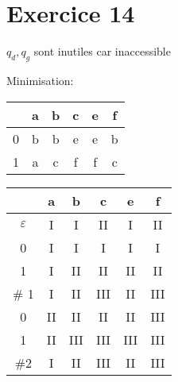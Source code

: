 \documentclass[12pt]{report}
\begin{document}
\section{Exercice 14}

$q_d, q_g$ sont inutiles car inaccessible

Minimisation:\\
\begin{tabular}{|c|c|c|c|c|c|}
    \hline
        & a   & b & c & e & f  \\ \hline
    0   & b  & b & e & e & b  \\ \hline
    1   & a   & c & f & f & c   \\ \hline
\end{tabular}\hspace{2cm}
\begin{tabular}{|c|c|c|c|c|c|}
    \hline
        & a   & b & c & e & f  \\ \hline
    $\varepsilon$   & I  & I & II & I & II  \\ \hline
    0   & I  & I & I & I & I   \\ \hline
    1   & I  & II & II & II & II   \\ \hline
     \hline
    $\#$ 1 & I & II & III & II & III \\ \hline
    0 & II & II & II & II & III\\ \hline
    1 & II & III & III & III & III\\ \hline 
    \hline
    $\#$2 & I & II & III & II & III\\\hline

\end{tabular}\hspace{2cm}
\end{document}
